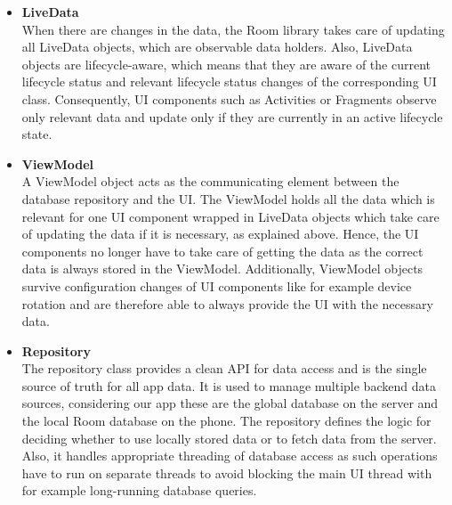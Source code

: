 \begin{itemize}
	\item \textbf{LiveData} \\
	When there are changes in the data, the Room library takes care of updating all LiveData objects, which are observable data holders. Also, LiveData objects are lifecycle-aware, which means that they are aware of the current lifecycle status and relevant lifecycle status changes of the corresponding UI class. Consequently, UI components such as Activities or Fragments observe only relevant data and update only if they are currently in an active lifecycle state. 
	
	\item \textbf{ViewModel} \\
	A ViewModel object acts as the communicating element between the database repository and the UI. The ViewModel holds all the data which is relevant for one UI component wrapped in LiveData objects which take care of updating the data if it is necessary, as explained above. Hence, the UI components no longer have to take care of getting the data as the correct data is always stored in the ViewModel. Additionally, ViewModel objects survive configuration changes of UI components like for example device rotation and are therefore able to always provide the UI with the necessary data. 
	
	\item \textbf{Repository} \\
	The repository class provides a clean API for data access and is the single source of truth for all app data. It is used to manage multiple backend data sources, considering our app these are the global database on the server and the local Room database on the phone. The repository defines the logic for deciding whether to use locally stored data or to fetch data from the server. Also, it handles appropriate threading of database access as such operations have to run on separate threads to avoid blocking the main UI thread with for example long-running database queries. 

\end{itemize}

